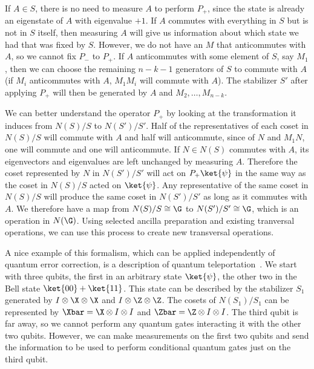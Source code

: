 If $A \in S$, there is no need to measure $A$ to perform $P_+$, since the
state is already an eigenstate of $A$ with eigenvalue $+1$.  If $A$
commutes with everything in $S$ but is not in $S$ itself, then measuring
$A$ will give us information about which state we had that was fixed by $S$.
However, we do not have an $M$ that anticommutes with $A$, so we
cannot fix $P_-$ to $P_+$.  If $A$ anticommutes with some element of $S$, say
$M_1$, then we can choose the remaining $n-k-1$ generators of $S$ to
commute with $A$ (if $M_i$ anticommutes with $A$, $M_1 M_i$ will
commute with $A$).  The stabilizer $S'$ after applying $P_+$ will then be
generated by $A$ and $M_2, \ldots, M_{n-k}$.

We can better understand the operator $P_+$ by looking at the
transformation it induces from $N(S)/S$ to $N(S')/S'$.  Half of the
representatives of each coset in $N(S)/S$ will commute with $A$ and half
will anticommute, since of $N$ and $M_1 N$, one will commute and one
will anticommute.  If $N \in N(S)$ commutes with $A$, its eigenvectors and
eigenvalues are left unchanged by measuring $A$.  Therefore the coset
represented by $N$ in $N(S')/S'$ will act on $P_+ \ket{\psi}$ in the same
way as the coset in $N(S)/S$ acted on $\ket{\psi}$.  Any representative of
the same coset in $N(S)/S$ will produce the same coset in $N(S')/S'$ as long
as it commutes with $A$.  We therefore have a map from $N(S)/S \cong
\G$ to $N(S')/S' \cong \G$, which is an operation in $N(\G)$.  Using selected
ancilla preparation and existing tranversal operations, we can use this
process to create new transversal operations.

A nice example of this formalism, which can be applied independently of
quantum error correction, is a description of quantum
teleportation~\cite{bennett-teleport}.  We start with three qubits, the first
in an arbitrary state $\ket{\psi}$, the other two in the Bell state $\ket{00}
+ \ket{11}$.  This state can be described by the stabilizer $S_1$ generated
by $I \otimes \X \otimes \X$ and $I \otimes \Z \otimes \Z$.  The cosets of
$N(S_1)/S_1$ can be represented by $\Xbar = \X \otimes I \otimes I$ and
$\Zbar = \Z \otimes I \otimes I$.  The third qubit is far away, so we cannot
perform any quantum gates interacting it with the other two qubits.
However, we can make measurements on the first two qubits and send the
information to be used to perform conditional quantum gates just on the
third qubit.

